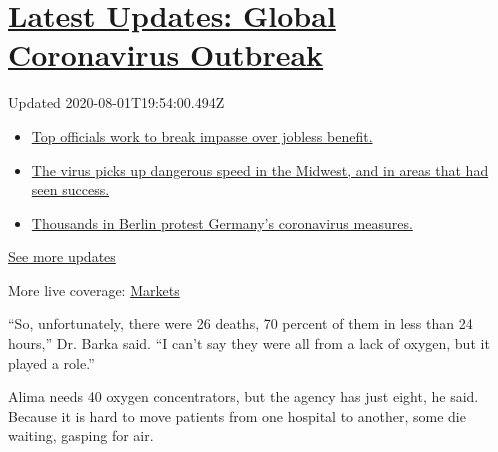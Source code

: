 \hypertarget{latest-updates-global-coronavirus-outbreak}{%
\section{\texorpdfstring{\href{https://www.nytimes3xbfgragh.onion/2020/08/01/world/coronavirus-covid-19.html?action=click\&pgtype=Article\&state=default\&region=MAIN_CONTENT_1\&context=storylines_live_updates}{Latest
Updates: Global Coronavirus
Outbreak}}{Latest Updates: Global Coronavirus Outbreak}}\label{latest-updates-global-coronavirus-outbreak}}

Updated 2020-08-01T19:54:00.494Z

\begin{itemize}
\tightlist
\item
  \href{https://www.nytimes3xbfgragh.onion/2020/08/01/world/coronavirus-covid-19.html?action=click\&pgtype=Article\&state=default\&region=MAIN_CONTENT_1\&context=storylines_live_updates\#link-3ac56579}{Top
  officials work to break impasse over jobless benefit.}
\item
  \href{https://www.nytimes3xbfgragh.onion/2020/08/01/world/coronavirus-covid-19.html?action=click\&pgtype=Article\&state=default\&region=MAIN_CONTENT_1\&context=storylines_live_updates\#link-8796723}{The
  virus picks up dangerous speed in the Midwest, and in areas that had
  seen success.}
\item
  \href{https://www.nytimes3xbfgragh.onion/2020/08/01/world/coronavirus-covid-19.html?action=click\&pgtype=Article\&state=default\&region=MAIN_CONTENT_1\&context=storylines_live_updates\#link-25930521}{Thousands
  in Berlin protest Germany's coronavirus measures.}
\end{itemize}

\href{https://www.nytimes3xbfgragh.onion/2020/08/01/world/coronavirus-covid-19.html?action=click\&pgtype=Article\&state=default\&region=MAIN_CONTENT_1\&context=storylines_live_updates}{See
more updates}

More live coverage:
\href{https://www.nytimes3xbfgragh.onion/live/2020/07/31/business/stock-market-today-coronavirus?action=click\&pgtype=Article\&state=default\&region=MAIN_CONTENT_1\&context=storylines_live_updates}{Markets}

``So, unfortunately, there were 26 deaths, 70 percent of them in less
than 24 hours,'' Dr. Barka said. ``I can't say they were all from a lack
of oxygen, but it played a role.''

Alima needs 40 oxygen concentrators, but the agency has just eight, he
said. Because it is hard to move patients from one hospital to another,
some die waiting, gasping for air.

